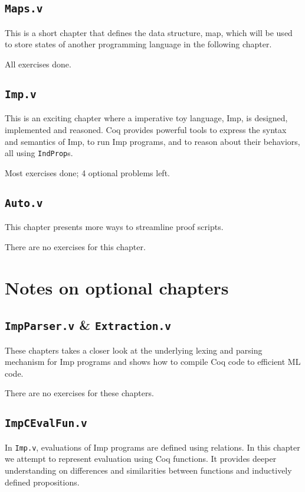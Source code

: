 \documentclass[screen,sigplan]{acmart}\settopmatter{printfolios=true,printccs=false,printacmref=false}
\begin{document}
\subsection{\texttt{Maps.v}}
This is a short chapter that defines the data structure, map, which will be used to store states
of another programming language in the following chapter.

All exercises done.

\subsection{\texttt{Imp.v}}
This is an exciting chapter where a imperative toy language, Imp, is designed, implemented and reasoned.
Coq provides powerful tools to express the syntax and semantics of Imp,
to run Imp programs, and to reason about their behaviors, all using \texttt{IndProp}s.

Most exercises done; 4 optional problems left.


\subsection{\texttt{Auto.v}}
This chapter presents more ways to streamline proof scripts.

There are no exercises for this chapter.



\section{Notes on optional chapters}

\subsection{\texttt{ImpParser.v} \& \texttt{Extraction.v}}
These chapters takes a closer look at the underlying lexing and parsing mechanism for Imp
programs and shows how to compile Coq code to efficient ML code.

There are no exercises for these chapters.


\subsection{\texttt{ImpCEvalFun.v}}
In \texttt{Imp.v}, evaluations of Imp programs are defined using relations. In this chapter we
attempt to represent evaluation using Coq functions. It provides deeper understanding on differences
and similarities between functions and inductively defined propositions.
\end{document}
